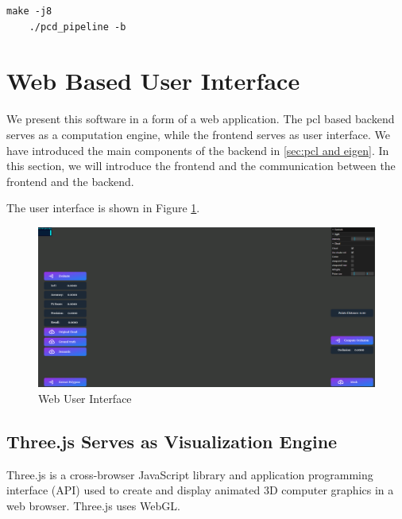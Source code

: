 \documentclass[11pt, a4paper,oneside,chapterprefix=false]{scrbook}
\begin{document}
\begin{lstlisting}[style=terminal]
	make -j8
	./pcd_pipeline -b
\end{lstlisting}

\section{Web Based User Interface} \label{sec:three.js}

We present this software in a form of a web application. The pcl based backend serves as a computation engine, while the frontend serves as user interface. We have introduced the main components of the backend in \ref{sec:pcl and eigen}. In this section, we will introduce the frontend and the communication between the frontend and the backend. 

The user interface is shown in Figure \ref{fig:web user interface}. 

\noindent
\begin{minipage}{\textwidth}
	\begin{figure}[H]
		\includegraphics*[width=1.0\textwidth]{figures/ui.png}
		\caption{Web User Interface }
		\label{fig:web user interface}
	\end{figure}
\end{minipage}

\subsection{Three.js Serves as Visualization Engine}

Three.js is a cross-browser JavaScript library and application programming interface (API) used to create and display animated 3D computer graphics in a web browser. Three.js uses WebGL.
\end{document}
